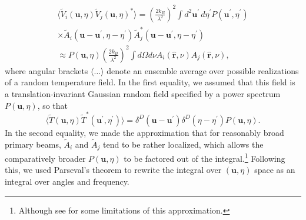 \documentclass[twocolumn,apj,numberedappendix]{emulateapj}
\newcommand{\rhat}{\hat{\mathbf{r}}}
\begin{document}
\begin{eqnarray}
\label{eq:visCrossCorr}
\langle \widetilde{V}_i(\mathbf{u},\eta) \widetilde{V}_j(\mathbf{u},\eta)^*\rangle = \left( \frac{2 k_B}{\lambda^2} \right)^2 \int d^2 \mathbf{u}^\prime \, d\eta^\prime  P(\mathbf{u}^\prime , \eta^\prime) \nonumber \\
\times \widetilde{A}_i (\mathbf{u} -\mathbf{u}^\prime, \eta-\eta^\prime) \widetilde{A}_j^* (\mathbf{u} -\mathbf{u}^\prime, \eta-\eta^\prime) \nonumber \\
\approx P(\mathbf{u} , \eta) \left( \frac{2 k_B}{\lambda^2} \right)^2 \int d\Omega d\nu A_i (\rhat,\nu) A_j (\rhat,\nu), \quad
\end{eqnarray}
where angular brackets $\langle \dots \rangle$ denote an ensemble average over possible realizations of a random temperature field. In the first equality, we assumed that this field is a translation-invariant Gaussian random field specified by a power spectrum $P(\mathbf{u}, \eta)$, so that
\begin{equation}
\langle \widetilde{T}(\mathbf{u} , \eta) \widetilde{T}^*(\mathbf{u}^\prime , \eta^\prime)\rangle = \delta^{D} (\mathbf{u} - \mathbf{u}^\prime) \delta^D (\eta - \eta^\prime) P(\mathbf{u}, \eta).
\end{equation}
In the second equality, we made the approximation that for reasonably broad primary beams, $\widetilde{A}_i $ and $\widetilde{A}_j$ tend to be rather localized, which allows the comparatively broader $P(\mathbf{u}, \eta)$ to be factored out of the integral.\footnote{Although see \citet{liu_et_al2014b} for some limitations of this approximation.} Following this, we used Parseval's theorem to rewrite the integral over $(\mathbf{u},\eta)$ space as an integral over angles and frequency.
\end{document}
